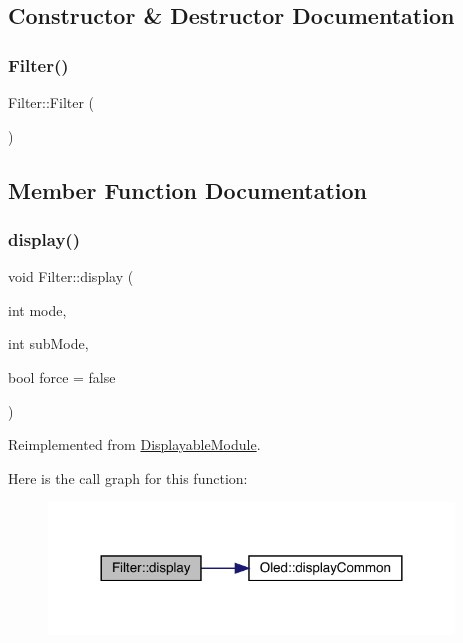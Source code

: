 \subsection{Constructor \& Destructor Documentation}
\mbox{\label{class_filter_ad15994c30d497afd567a6445446a249e}} 
\subsubsection{\texorpdfstring{Filter()}{Filter()}}
{\footnotesize\ttfamily Filter\+::\+Filter (\begin{DoxyParamCaption}{ }\end{DoxyParamCaption})}



\subsection{Member Function Documentation}
\mbox{\label{class_filter_a3a2062c5c576d18cd734546ca41d29ad}} 
\subsubsection{\texorpdfstring{display()}{display()}}
{\footnotesize\ttfamily void Filter\+::display (\begin{DoxyParamCaption}\item[{int}]{mode,  }\item[{int}]{sub\+Mode,  }\item[{bool}]{force = {\ttfamily false} }\end{DoxyParamCaption})\hspace{0.3cm}{\ttfamily [virtual]}}



Reimplemented from \mbox{\hyperlink{class_displayable_module_a02de26d62ef508cae9ed07920e21784d}{Displayable\+Module}}.

Here is the call graph for this function\+:\nopagebreak
\begin{figure}[H]
\begin{center}
\leavevmode
\includegraphics[width=305pt]{class_filter_a3a2062c5c576d18cd734546ca41d29ad_cgraph}
\end{center}
\end{figure}
\mbox{\label{class_filter_acff0d2a488a223caa11d48a6147c7feb}} 
